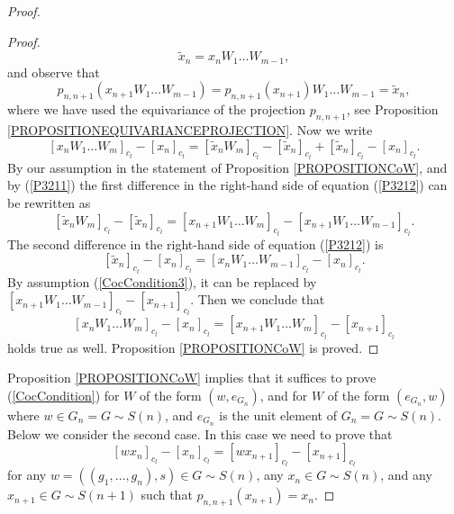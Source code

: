 \documentclass[10pt,a4paper]{amsart}
\begin{document}
\begin{proof}
\begin{proof}
$$
\tilde{x}_n=x_nW_1\ldots W_{m-1},
$$
and observe that
\begin{equation}\label{P3211}
p_{n,n+1}\left(x_{n+1}W_1\ldots W_{m-1}\right)=p_{n,n+1}\left(x_{n+1}\right)W_1\ldots W_{m-1}=\tilde{x}_n,
\end{equation}
where we have used the equivariance of the projection $p_{n,n+1}$, see Proposition \ref{PROPOSITIONEQUIVARIANCEPROJECTION}. Now we write
\begin{equation}\label{P3212}
\left[x_nW_1\ldots W_{m}\right]_{c_l}-\left[x_n\right]_{c_l}=\left[\tilde{x}_nW_m\right]_{c_l}-\left[\tilde{x}_n\right]_{c_l}+\left[\tilde{x}_n\right]_{c_l}-\left[x_n\right]_{c_l}.
\end{equation}
By our assumption in the statement of  Proposition \ref{PROPOSITIONCoW}, and by (\ref{P3211}) the first difference in the right-hand side of equation (\ref{P3212}) can be rewritten as
\begin{equation}\label{P3213}
\left[\tilde{x}_nW_m\right]_{c_l}-\left[\tilde{x}_n\right]_{c_l}=\left[x_{n+1}W_1\ldots W_m\right]_{c_l}-\left[x_{n+1}W_1\ldots W_{m-1}\right]_{c_l}.
\end{equation}
The second difference in the right-hand side of equation (\ref{P3212}) is
\begin{equation}\label{P3214}
\left[\tilde{x}_n\right]_{c_l}-\left[x_n\right]_{c_l}=\left[x_nW_1\ldots W_{m-1}\right]_{c_l}-\left[x_n\right]_{c_l}.
\end{equation}
By assumption (\ref{CocCondition3}), it can be replaced by $\left[x_{n+1}W_1\ldots W_{m-1}\right]_{c_l}-\left[x_{n+1}\right]_{c_l}$. Then we conclude that
$$
\left[x_nW_1\ldots W_{m}\right]_{c_l}-\left[x_n\right]_{c_l}=\left[x_{n+1}W_1\ldots W_{m}\right]_{c_l}-\left[x_{n+1}\right]_{c_l}
$$
holds true as well. Proposition \ref{PROPOSITIONCoW} is proved.
\end{proof}
Proposition \ref{PROPOSITIONCoW} implies that it suffices to prove (\ref{CocCondition})
for $W$ of the form $\left(w,e_{G_n}\right)$, and for $W$ of the form $\left(e_{G_n},w\right)$
where $w\in G_n=G\sim S(n)$, and $e_{G_n}$ is the unit element of $G_n=G\sim S(n)$. Below we consider the second case. In this case we need to prove that
\begin{equation}
\left[wx_n\right]_{c_l}-\left[x_n\right]_{c_l}=\left[wx_{n+1}\right]_{c_l}-\left[x_{n+1}\right]_{c_l}
\end{equation}
for any $w=\left(\left(g_1,\ldots,g_n\right),s\right)\in G\sim S(n)$, any $x_n\in G\sim S(n)$, and any $x_{n+1}\in G\sim S(n+1)$ such that $p_{n,n+1}\left(x_{n+1}\right)=x_n$.

\end{proof}
\end{document}
